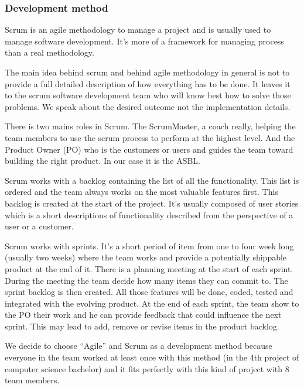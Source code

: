 \subsubsection{Development method}
Scrum is an agile methodology to manage a project and is usually used to manage software development. It's more of a framework for managing process than a real methodology.\newline

The main idea behind scrum and behind agile methodology in general is not to provide a full detailed description of how everything has to be done. It leaves it to the scrum software development team who will know best how to solve those problems. We speak about the desired outcome not the implementation details.\newline

There is two mains roles in Scrum. The ScrumMaster, a coach really, helping the team members to use the scrum process to perform at the highest level. And the Product Owner (PO) who is the customers or users and guides the team toward building the right product. In our case it is the ASBL.\newline

Scrum works with a backlog containing the list of all the functionality. This list is ordered and the team always works on the most valuable features first. This backlog is created at the start of the project. It's usually composed of user stories which is a short descriptions of functionality described from the perspective of a user or a customer.\newline

Scrum works with sprints. It's a short period of item from one to four week long (usually two weeks) where the team works and provide a potentially shippable product at the end of it. There is a planning meeting at the start of each sprint. During the meeting the team decide how many items they can commit to. The sprint backlog is then created. All those features will be done, coded, tested and integrated with the evolving product. At the end of each sprint, the team show to the PO their work and he can provide feedback that could influence the next sprint. This may lead to add, remove or revise items in the product backlog.\newline

We decide to choose \enquote{Agile} and Scrum as a development method because
everyone in the team worked at least once with this method (in the 4th
project of computer science bachelor) and it fits perfectly with this
kind of project with 8 team members.\newline


